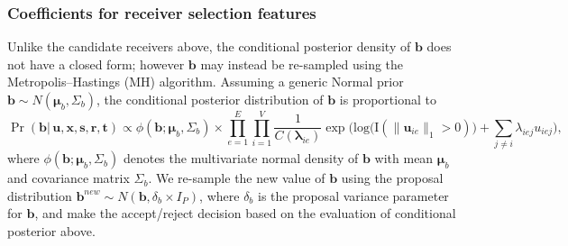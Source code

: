 \documentclass[ba]{imsart}
\numberwithin{equation}{section}
\theoremstyle{plain}
\begin{document}
	\subsubsection{Coefficients for receiver selection features}
	Unlike the candidate receivers above, the conditional posterior density of $\boldsymbol{b}$ does not have a closed form; however $\boldsymbol{b}$ may instead be re-sampled using the Metropolis--Hastings (MH) algorithm. Assuming a generic Normal prior $\boldsymbol{b}\sim N(\boldsymbol{\mu}_b, \Sigma_b)$, the conditional posterior distribution of $\boldsymbol{b}$ is proportional to~
	\begin{equation}
		\Pr(\boldsymbol{b}| \,\boldsymbol{u}, \boldsymbol{x}, \boldsymbol{s}, \boldsymbol{r},\boldsymbol{t})\propto \phi(\boldsymbol{b}; \boldsymbol{\mu}_b, \Sigma_b)\times \prod_{e=1}^E
		\prod_{i=1}^V \frac{1}{C(\boldsymbol{\lambda}_{ie})}\exp\Big(\mbox{log}\big(\text{I}( \lVert \boldsymbol{u}_{ie}\rVert_1 > 0)\big) + \sum\limits_{j \neq i} \lambda_{iej}u_{iej}\Big),
		\label{eqn:latentedge}
	\end{equation}
	where $\phi(\boldsymbol{b}; \boldsymbol{\mu}_b, \Sigma_b)$ denotes the multivariate normal density of $\boldsymbol{b}$ with mean $\boldsymbol{\mu}_b$ and covariance matrix $\Sigma_b$. We re-sample the new value of $\boldsymbol{b}$ using the proposal distribution $\boldsymbol{b}^{new}\sim N(\boldsymbol{b}, \delta_b\times I_P)$, where $\delta_b$ is the proposal variance parameter for $\boldsymbol{b}$, and make the accept/reject decision based on the evaluation of conditional posterior above.
\end{document}
